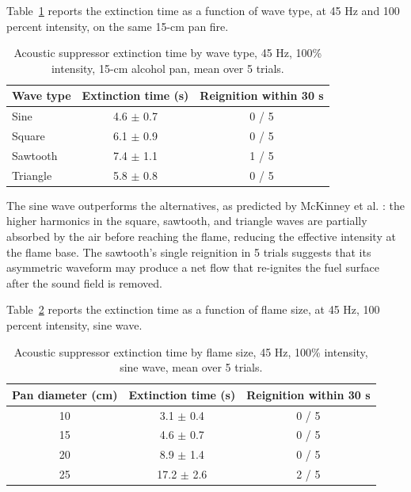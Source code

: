 Table~\ref{tab:wavetype} reports the extinction time as a function of wave type, at 45 Hz and 100 percent intensity, on the same 15-cm pan fire.

\begin{table}[H]
\centering
\caption{Acoustic suppressor extinction time by wave type, 45 Hz, 100\% intensity, 15-cm alcohol pan, mean over 5 trials.}
\label{tab:wavetype}
\small
\begin{tabularx}{0.7\textwidth}{|X|c|c|}
\hline
\textbf{Wave type} & \textbf{Extinction time (s)} & \textbf{Reignition within 30 s} \\
\hline
Sine & 4.6 $\pm$ 0.7 & 0 / 5 \\
\hline
Square & 6.1 $\pm$ 0.9 & 0 / 5 \\
\hline
Sawtooth & 7.4 $\pm$ 1.1 & 1 / 5 \\
\hline
Triangle & 5.8 $\pm$ 0.8 & 0 / 5 \\
\hline
\end{tabularx}
\end{table}

The sine wave outperforms the alternatives, as predicted by McKinney et al. \cite{mckinney2019sonic}: the higher harmonics in the square, sawtooth, and triangle waves are partially absorbed by the air before reaching the flame, reducing the effective intensity at the flame base. The sawtooth's single reignition in 5 trials suggests that its asymmetric waveform may produce a net flow that re-ignites the fuel surface after the sound field is removed.

Table~\ref{tab:flamesize} reports the extinction time as a function of flame size, at 45 Hz, 100 percent intensity, sine wave.

\begin{table}[H]
\centering
\caption{Acoustic suppressor extinction time by flame size, 45 Hz, 100\% intensity, sine wave, mean over 5 trials.}
\label{tab:flamesize}
\small
\begin{tabularx}{0.8\textwidth}{|c|c|c|}
\hline
\textbf{Pan diameter (cm)} & \textbf{Extinction time (s)} & \textbf{Reignition within 30 s} \\
\hline
10 & 3.1 $\pm$ 0.4 & 0 / 5 \\
\hline
15 & 4.6 $\pm$ 0.7 & 0 / 5 \\
\hline
20 & 8.9 $\pm$ 1.4 & 0 / 5 \\
\hline
25 & 17.2 $\pm$ 2.6 & 2 / 5 \\
\hline
\end{tabularx}
\end{table}

